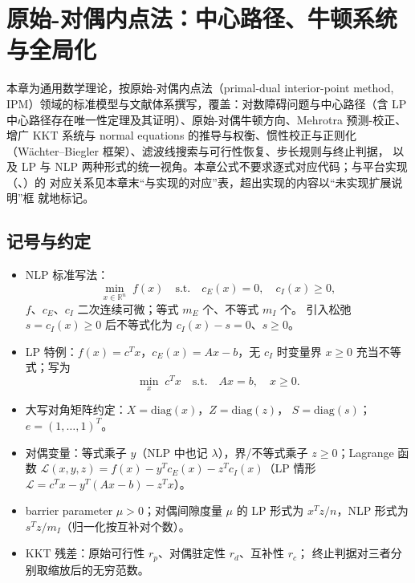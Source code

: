 
\section{原始-对偶内点法：中心路径、牛顿系统与全局化}\label{sec:thipm}

\begin{theorynote}
本章为通用数学理论，按原始-对偶内点法（primal-dual interior-point method,
IPM）领域的标准模型与文献体系撰写，覆盖：对数障碍问题与中心路径（含 LP
中心路径存在唯一性定理及其证明）、原始-对偶牛顿方向、Mehrotra 预测-校正、
增广 KKT 系统与 normal equations 的推导与权衡、惯性校正与正则化
（W\"achter--Biegler 框架）、滤波线搜索与可行性恢复、步长规则与终止判据，
以及 LP 与 NLP 两种形式的统一视角。本章公式不要求逐式对应代码；与平台实现
（、）的
对应关系见本章末``与实现的对应''表，超出实现的内容以``未实现扩展说明''框
就地标记。
\end{theorynote}

\subsection{记号与约定}\label{subsec:thipm-notation}

\begin{itemize}
  \item NLP 标准写法：
        \begin{equation}\label{eq:thipm-nlp}
          \min_{x\in\mathbb{R}^{n}}\; f(x)
          \quad\text{s.t.}\quad c_E(x)=0,\quad c_I(x)\ge0,
        \end{equation}
        $f$、$c_E$、$c_I$ 二次连续可微；等式 $m_E$ 个、不等式 $m_I$ 个。
        引入松弛 $s=c_I(x)\ge0$ 后不等式化为 $c_I(x)-s=0$、$s\ge0$。
  \item LP 特例：$f(x)=c^{T}x$，$c_E(x)=Ax-b$，无 $c_I$ 时变量界
        $x\ge0$ 充当不等式；写为
        \begin{equation}\label{eq:thipm-lp}
          \min_{x}\;c^{T}x\quad\text{s.t.}\quad Ax=b,\quad x\ge0 .
        \end{equation}
  \item 大写对角矩阵约定：$X=\mathrm{diag}(x)$，$Z=\mathrm{diag}(z)$，
        $S=\mathrm{diag}(s)$；$e=(1,\dots,1)^{T}$。
  \item 对偶变量：等式乘子 $y$（NLP 中也记 $\lambda$），界/不等式乘子
        $z\ge0$；Lagrange 函数
        $\mathcal{L}(x,y,z)=f(x)-y^{T}c_E(x)-z^{T}c_I(x)$（LP 情形
        $\mathcal{L}=c^{T}x-y^{T}(Ax-b)-z^{T}x$）。
  \item barrier parameter $\mu>0$；对偶间隙度量 $\mu$ 的 LP 形式为
        $x^{T}z/n$，NLP 形式为 $s^{T}z/m_I$（归一化按互补对个数）。
  \item KKT 残差：原始可行性 $r_p$、对偶驻定性 $r_d$、互补性 $r_c$；
        终止判据对三者分别取缩放后的无穷范数。
\end{itemize}

